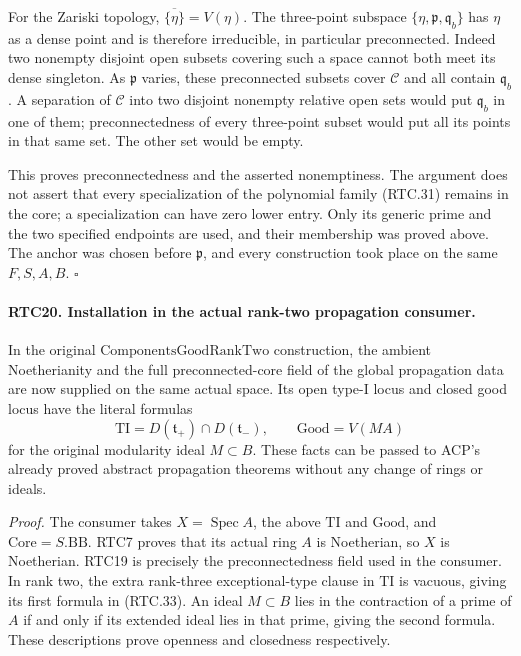 For the Zariski topology,
\(\overline{\{\eta\}}=V(\eta)\).  The three-point subspace
\(\{\eta,\mathfrak p,\mathfrak q_b\}\) has \(\eta\) as
a dense point and is therefore irreducible, in particular
preconnected.  Indeed two nonempty disjoint open subsets covering
such a space cannot both meet its dense singleton.  As
\(\mathfrak p\) varies, these preconnected subsets cover
\(\mathcal C\) and all contain \(\mathfrak q_b\).
A separation of \(\mathcal C\) into two disjoint nonempty
relative open sets would put \(\mathfrak q_b\) in one of them;
preconnectedness of every three-point subset would put all its
points in that same set.  The other set would be empty.

This proves preconnectedness and the asserted nonemptiness.
The argument does not assert that every specialization of the
polynomial family (RTC.31) remains in the core; a specialization
can have zero lower entry.  Only its generic prime and the two
specified endpoints are used, and their membership was proved
above.  The anchor was chosen before \(\mathfrak p\), and
every construction took place on the same \(F,S,A,B\).
\hfill\(\square\)

\paragraph{RTC20. Installation in the actual rank-two propagation consumer.}
\label{claim:RTC20}
In the original \(\mathrm{ComponentsGoodRankTwo}\) construction,
the ambient Noetherianity and the full preconnected-core field of
the global propagation data are now supplied on the same actual
space.  Its open type-I locus and closed good locus have the
literal formulas
\[
 \mathrm{TI}
 =D(\mathfrak t_+)\cap D(\mathfrak t_-),\qquad
 \mathrm{Good}=V(MA)
                                                        \tag{RTC.33}
\]
for the original modularity ideal \(M\subset B\).
These facts can be passed to ACP's already proved abstract
propagation theorems without any change of rings or ideals.

\emph{Proof.}
The consumer takes \(X=\operatorname{Spec}A\), the above
\(\mathrm{TI}\) and \(\mathrm{Good}\), and
\(\mathrm{Core}=S.\mathrm{BB}\).  RTC7 proves that its actual
ring \(A\) is Noetherian, so \(X\) is Noetherian.  RTC19
is precisely the preconnectedness field used in the consumer.
In rank two, the extra rank-three exceptional-type clause in
\(\mathrm{TI}\) is vacuous, giving its first formula in
(RTC.33).  An ideal \(M\subset B\) lies in the contraction
of a prime of \(A\) if and only if its extended ideal lies
in that prime, giving the second formula.  These descriptions
prove openness and closedness respectively.


